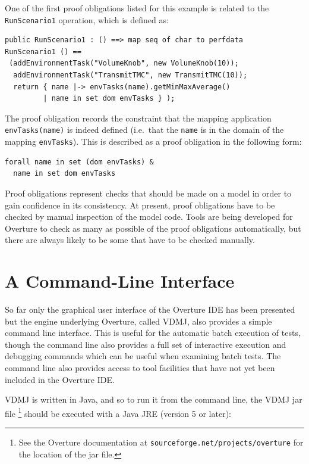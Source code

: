 One of the first proof obligations listed for this example is related
to the \texttt{RunScenario1} operation, which is defined as:

\begin{lstlisting}
public RunScenario1 : () ==> map seq of char to perfdata
RunScenario1 () ==
 (addEnvironmentTask("VolumeKnob", new VolumeKnob(10));
  addEnvironmentTask("TransmitTMC", new TransmitTMC(10));
  return { name |-> envTasks(name).getMinMaxAverage() 
         | name in set dom envTasks } );
\end{lstlisting}

The proof obligation records the constraint that the mapping
application \texttt{envTasks(name)} is indeed defined (i.e.\ that the
\texttt{name} is in the domain of the mapping \texttt{envTasks}). This is described as a proof
obligation in the following form:

\begin{lstlisting}
forall name in set (dom envTasks) &
  name in set dom envTasks
\end{lstlisting}
Proof obligations represent checks that should be made on a model in
order to gain confidence in its consistency. At present, proof
obligations have to be checked by manual inspection of the model
code. Tools are being developed for Overture to check as many as
possible of the proof obligations automatically, but there are always
likely to be some that have to be checked manually. 


\section{A Command-Line Interface}\label{sec:cmdline}

So far only the graphical user interface of the Overture IDE has been
presented but the engine underlying Overture, called VDMJ, also
provides a simple command line interface.  This is useful for the
automatic batch execution of tests, though the command line also
provides a full set of interactive execution and debugging commands
which can be useful when examining batch tests. The command line also
provides access to tool facilities that have not yet been included in
the Overture IDE.

VDMJ is written in Java, and so to run it from the command line, the
VDMJ jar file \footnote{See the Overture documentation at
  \texttt{sourceforge.net/projects/overture} for the location of the
  jar file.}  should be executed with a Java JRE (version 5 or later):


